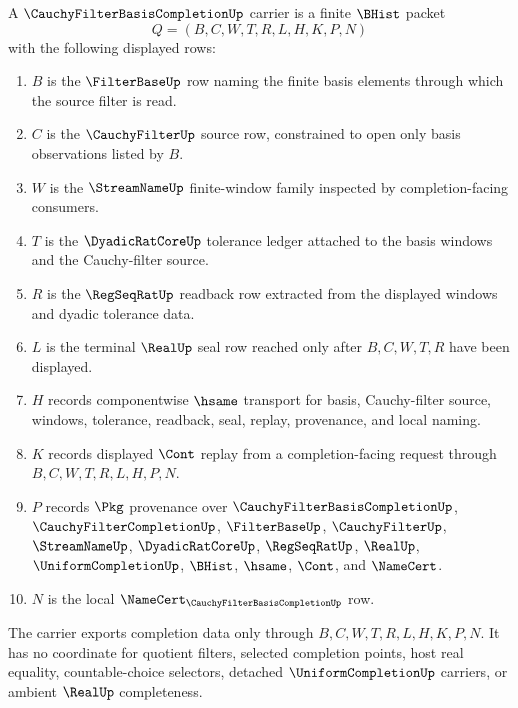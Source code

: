 \begin{definition}
\label{def:cauchy-filter-basis-completion-carrier}
A $\CauchyFilterBasisCompletionUp$ carrier is a finite $\BHist$ packet
$$
Q=(B,C,W,T,R,L,H,K,P,N)
$$
with the following displayed rows:
\begin{enumerate}
\item $B$ is the $\FilterBaseUp$ row naming the finite basis elements through which the source filter is read.
\item $C$ is the $\CauchyFilterUp$ source row, constrained to open only basis observations listed by $B$.
\item $W$ is the $\StreamNameUp$ finite-window family inspected by completion-facing consumers.
\item $T$ is the $\DyadicRatCoreUp$ tolerance ledger attached to the basis windows and the Cauchy-filter source.
\item $R$ is the $\RegSeqRatUp$ readback row extracted from the displayed windows and dyadic tolerance data.
\item $L$ is the terminal $\RealUp$ seal row reached only after $B,C,W,T,R$ have been displayed.
\item $H$ records componentwise $\hsame$ transport for basis, Cauchy-filter source, windows, tolerance, readback, seal, replay, provenance, and local naming.
\item $K$ records displayed $\Cont$ replay from a completion-facing request through $B,C,W,T,R,L,H,P,N$.
\item $P$ records $\Pkg$ provenance over $\CauchyFilterBasisCompletionUp$, $\CauchyFilterCompletionUp$, $\FilterBaseUp$, $\CauchyFilterUp$, $\StreamNameUp$, $\DyadicRatCoreUp$, $\RegSeqRatUp$, $\RealUp$, $\UniformCompletionUp$, $\BHist$, $\hsame$, $\Cont$, and $\NameCert$.
\item $N$ is the local $\NameCert_{\CauchyFilterBasisCompletionUp}$ row.
\end{enumerate}
The carrier exports completion data only through $B,C,W,T,R,L,H,K,P,N$. It has no coordinate for quotient filters, selected completion points, host real equality, countable-choice selectors, detached $\UniformCompletionUp$ carriers, or ambient $\RealUp$ completeness.
\end{definition}

